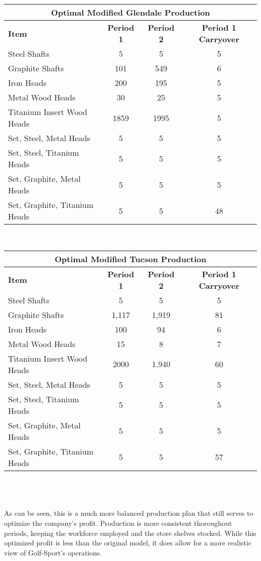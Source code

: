 \documentclass{article}
\begin{document}
\begin{tabular}{ l | c | c | c }
\hline
\multicolumn{4}{|c|}{Optimal Modified Glendale Production} \\
\hline
\textbf{Item} & \textbf{Period 1} & \textbf{Period 2} & \textbf{Period 1 Carryover} \\
Steel Shafts & 5 & 5 & 5 \\
Graphite Shafts & 101 & 549 & 6 \\
Iron Heads & 200 & 195 & 5 \\
Metal Wood Heads & 30 & 25 & 5 \\
Titanium Insert Wood Heads & 1859 & 1995 & 5 \\
Set, Steel, Metal Heads & 5 & 5 & 5 \\
Set, Steel, Titanium Heads & 5 & 5 & 5 \\
Set, Graphite, Metal Heads & 5 & 5 & 5 \\
Set, Graphite, Titanium Heads & 5 & 5 & 48\\
\end{tabular}
\vspace{5mm}
\\
\noindent
\begin{tabular}{ l | c | c | c }
\hline
\multicolumn{4}{|c|}{Optimal Modified Tucson Production} \\
\hline
\textbf{Item} & \textbf{Period 1} & \textbf{Period 2} & \textbf{Period 1 Carryover} \\
Steel Shafts & 5 & 5 & 5 \\
Graphite Shafts & 1,117 & 1,919 & 81 \\
Iron Heads & 100 & 94 & 6 \\
Metal Wood Heads & 15 & 8 & 7 \\
Titanium Insert Wood Heads & 2000 & 1,940 & 60 \\
Set, Steel, Metal Heads & 5 & 5 & 5 \\
Set, Steel, Titanium Heads & 5 & 5 & 5 \\
Set, Graphite, Metal Heads & 5 & 5 & 5 \\
Set, Graphite, Titanium Heads & 5 & 5 & 57\\
\end{tabular}
\\
\\
\vspace{5mm}
\\
As can be seen, this is a much more balanced production plan that still serves to optimize the company's profit.  Production is more consistent thoroughout periods, keeping the workforce employed and the store shelves stocked.  While this optimized profit is less than the original model, it does allow for a more realistic view of Golf-Sport's operations.
\end{document}
